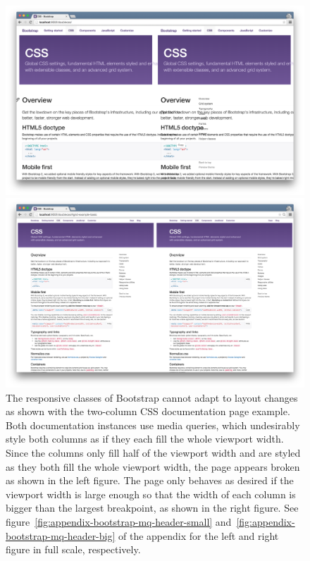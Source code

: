 \documentclass[a4paper,11pt]{kth-mag}
\begin{document}
      \begin{figure}[htbp]
        \centering
        \begin{minipage}{.5\textwidth}
          \centering
          \includegraphics[width=\linewidth]{images/bootstrap-mq-header-small}
        \end{minipage}%
        \begin{minipage}{.5\textwidth}
          \centering
          \includegraphics[width=\linewidth]{images/bootstrap-mq-header-big}
        \end{minipage}
        \caption{
          The \gls{responsive} classes of \gls{Bootstrap} cannot adapt to layout changes as shown with the two-column \gls{CSS} documentation page example.
          Both documentation instances use \gls{media queries}, which undesirably style both columns as if they each fill the whole \gls{viewport} width.
          Since the columns only fill half of the \gls{viewport} width and are styled as they both fill the whole \gls{viewport} width, the page appears broken as shown in the left figure.
          The page only behaves as desired if the \gls{viewport} width is large enough so that the width of each column is bigger than the largest  breakpoint, as shown in the right figure.
          See figure~\ref{fig:appendix-bootstrap-mq-header-small} and~\ref{fig:appendix-bootstrap-mq-header-big} of the appendix for the left and right figure in full scale, respectively.}
        \label{fig:eval-bootstrap-mq-broken}
      \end{figure}
\end{document}
